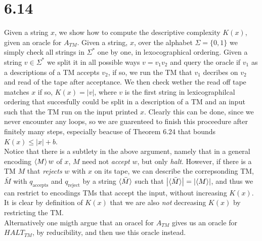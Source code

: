\documentclass[a4paper,11pt]{article}
\newcommand{\abs}[1]{\left\lvert #1 \right\rvert}
\numberwithin{equation}{section}
\begin{document}
\section*{6.14}
Given a string $ x $, we show how to compute the descriptive complexity $ K(x) $, given an oracle for $ A_{TM} $. Given a string, $ x $, over the alphabet $ \Sigma=\{0,1\} $ we simply check all strings in $ \Sigma^* $ one by one, in lexocographical ordering. Given a string $ v\in\Sigma^* $ we split it in all possible ways $ v=v_1v_2 $ and query the oracle if $ v_1 $ as a descriptions of a TM accepts $ v_2 $, if so, we run the TM that $ v_1 $ decribes on $ v_2 $ and read of the tape after acceptance. We then check wether the read off tape matches $ x $ if so, $ K(x)=\abs{v} $, where $ v $ is the first string in lexicographilcal ordering that succesfully could be split in a description of a TM and an input such that the TM run on the input printed $ x $. Clearly this can be done, since we never encounter any loops, so we are guarenteed to finish this proceedure after finitely many steps, especially beacuse of Theorem 6.24 that bounds $ K(x)\leq \abs{x}+b $.
\\
Notice that there is a subtlety in the above argument, namely that in a general encoding $ \braket{M}w $ of $ x $, $ M $ need not \emph{accept} $ w $, but only \emph{halt}. However, if there is a TM $ M $ that \emph{rejects} $ w $ with $ x $ on its tape, we can describe the correpsonding TM, $ \bar{M} $ with $ q_{\text{accepts}} $ and $ q_{\text{reject}} $ by a string $ \braket{\bar{M}} $ such that $ \abs{\braket{\bar{M}}}=\abs{\braket{M}} $, and thus we can restrict to encodings TMs that accept the input, without increasing $ K(x) $. It is clear by definition of $ K(x) $ that we are also \emph{not} decreasing $ K(x) $ by restricting the TM. \\
Alternatively one migth argue that an oracel for $ A_{TM} $ gives us an oracle for $ HALT_{TM} $, by reducibility, and then use this oracle instead.
\end{document}

